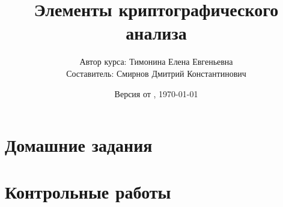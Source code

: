 \documentclass[letterpaper,11pt,openany]{book}
\title{Элементы криптографического анализа}
\author{Автор курса: Тимонина Елена Евгеньевна \\ 
		Составитель: Смирнов Дмитрий Константинович }
\date{Версия от \currenttime, \today}
\begin{document}
\maketitle
\tableofcontents

\mainmatter

\chapter{Домашние задания}







\newpage
\chapter{Контрольные работы}







\end{document}
